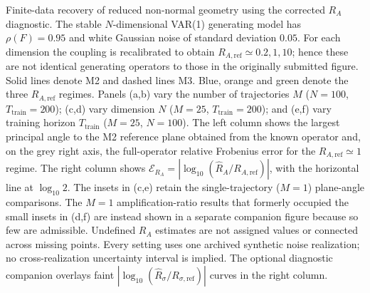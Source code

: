 \caption{Finite-data recovery of reduced non-normal geometry using the corrected $R_A$ diagnostic. The stable $N$-dimensional VAR(1) generating model has $\rho(F)=0.95$ and white Gaussian noise of standard deviation $0.05$. For each dimension the coupling is recalibrated to obtain $R_{A,\mathrm{ref}}\simeq0.2,1,10$; hence these are not identical generating operators to those in the originally submitted figure. Solid lines denote M2 and dashed lines M3. Blue, orange and green denote the three $R_{A,\mathrm{ref}}$ regimes. Panels (a,b) vary the number of trajectories $M$ ($N=100$, $T_{\mathrm{train}}=200$); (c,d) vary dimension $N$ ($M=25$, $T_{\mathrm{train}}=200$); and (e,f) vary training horizon $T_{\mathrm{train}}$ ($M=25$, $N=100$). The left column shows the largest principal angle to the M2 reference plane obtained from the known operator and, on the grey right axis, the full-operator relative Frobenius error for the $R_{A,\mathrm{ref}}\simeq1$ regime. The right column shows $\mathcal E_{R_A}=|\log_{10}(\widehat R_A/R_{A,\mathrm{ref}})|$, with the horizontal line at $\log_{10}2$. The insets in (c,e) retain the single-trajectory ($M=1$) plane-angle comparisons. The $M=1$ amplification-ratio results that formerly occupied the small insets in (d,f) are instead shown in a separate companion figure because so few are admissible. Undefined $R_A$ estimates are not assigned values or connected across missing points. Every setting uses one archived synthetic noise realization; no cross-realization uncertainty interval is implied. The optional diagnostic companion overlays faint $|\log_{10}(\widehat R_\sigma/R_{\sigma,\mathrm{ref}})|$ curves in the right column.}
